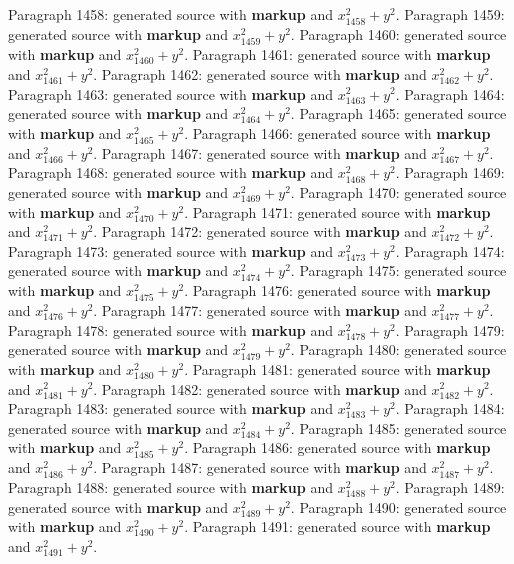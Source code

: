\documentclass{article}
\begin{document}
Paragraph 1458: generated source with \textbf{markup} and $x_{1458}^2 + y^2$.
Paragraph 1459: generated source with \textbf{markup} and $x_{1459}^2 + y^2$.
Paragraph 1460: generated source with \textbf{markup} and $x_{1460}^2 + y^2$.
Paragraph 1461: generated source with \textbf{markup} and $x_{1461}^2 + y^2$.
Paragraph 1462: generated source with \textbf{markup} and $x_{1462}^2 + y^2$.
Paragraph 1463: generated source with \textbf{markup} and $x_{1463}^2 + y^2$.
Paragraph 1464: generated source with \textbf{markup} and $x_{1464}^2 + y^2$.
Paragraph 1465: generated source with \textbf{markup} and $x_{1465}^2 + y^2$.
Paragraph 1466: generated source with \textbf{markup} and $x_{1466}^2 + y^2$.
Paragraph 1467: generated source with \textbf{markup} and $x_{1467}^2 + y^2$.
Paragraph 1468: generated source with \textbf{markup} and $x_{1468}^2 + y^2$.
Paragraph 1469: generated source with \textbf{markup} and $x_{1469}^2 + y^2$.
Paragraph 1470: generated source with \textbf{markup} and $x_{1470}^2 + y^2$.
Paragraph 1471: generated source with \textbf{markup} and $x_{1471}^2 + y^2$.
Paragraph 1472: generated source with \textbf{markup} and $x_{1472}^2 + y^2$.
Paragraph 1473: generated source with \textbf{markup} and $x_{1473}^2 + y^2$.
Paragraph 1474: generated source with \textbf{markup} and $x_{1474}^2 + y^2$.
Paragraph 1475: generated source with \textbf{markup} and $x_{1475}^2 + y^2$.
Paragraph 1476: generated source with \textbf{markup} and $x_{1476}^2 + y^2$.
Paragraph 1477: generated source with \textbf{markup} and $x_{1477}^2 + y^2$.
Paragraph 1478: generated source with \textbf{markup} and $x_{1478}^2 + y^2$.
Paragraph 1479: generated source with \textbf{markup} and $x_{1479}^2 + y^2$.
Paragraph 1480: generated source with \textbf{markup} and $x_{1480}^2 + y^2$.
Paragraph 1481: generated source with \textbf{markup} and $x_{1481}^2 + y^2$.
Paragraph 1482: generated source with \textbf{markup} and $x_{1482}^2 + y^2$.
Paragraph 1483: generated source with \textbf{markup} and $x_{1483}^2 + y^2$.
Paragraph 1484: generated source with \textbf{markup} and $x_{1484}^2 + y^2$.
Paragraph 1485: generated source with \textbf{markup} and $x_{1485}^2 + y^2$.
Paragraph 1486: generated source with \textbf{markup} and $x_{1486}^2 + y^2$.
Paragraph 1487: generated source with \textbf{markup} and $x_{1487}^2 + y^2$.
Paragraph 1488: generated source with \textbf{markup} and $x_{1488}^2 + y^2$.
Paragraph 1489: generated source with \textbf{markup} and $x_{1489}^2 + y^2$.
Paragraph 1490: generated source with \textbf{markup} and $x_{1490}^2 + y^2$.
Paragraph 1491: generated source with \textbf{markup} and $x_{1491}^2 + y^2$.
\end{document}
